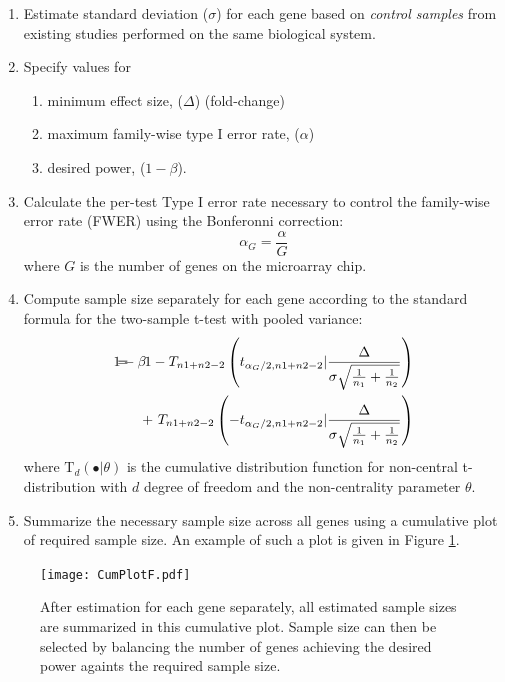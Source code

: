 \documentclass{bioinfo}
\begin{document}
\begin{enumerate}
\item{Estimate standard deviation ($\sigma$) for each gene based on
    \emph{control samples} from existing studies performed on the
    same biological system.}

\item{Specify values for
    \begin{enumerate}
    \item minimum effect size, ($\Delta$) (fold-change)
    \item maximum family-wise type I error rate, ($\alpha$)
    \item desired power, ($1 - \beta$).
    \end{enumerate}
  }

\item{Calculate the per-test Type I error rate necessary to control
    the family-wise error rate (FWER) using the Bonferonni correction:}
\begin{equation}
  \alpha_G = \frac{\alpha}{G}
\end{equation}
%
where $G$ is the number of genes on the microarray chip.

\item{Compute sample size separately for each gene according to the
    standard formula for the two-sample t-test with pooled variance:}
  \begin{eqnarray}
    \lefteqn{1-\beta}
    &=& 1-T_{n1+n2-2} \left( t_{\alpha_G/2,n1+n2-2} | \frac{\Delta}{\sigma \sqrt{\frac{1}{n_1} + \frac{1}{n_2}}}\right) \nonumber \\
    & & +~T_{n1+n2-2} \left( -t_{\alpha_G/2,n1+n2-2} | \frac{\Delta}{\sigma \sqrt{\frac{1}{n_1} + \frac{1}{n_2}}}\right)
    \label{eq:formula}
  \end{eqnarray}
  where $\mathrm{T}_{d}(\bullet|\theta)$ is the cumulative
  distribution function for non-central t-distribution with $d$ degree
  of freedom and the non-centrality parameter $\theta$.

\item{Summarize the necessary sample size across all genes using a
    cumulative plot of required sample size. An example of such a plot
    is given in Figure \ref{fig:CumPlot}.}

\end{enumerate}

\begin{figure}[h]
  \centerline{\texttt{[image: CumPlotF.pdf]}}
  \caption[Cumulative Plot of Sample Size Calculated for All Genes]
  {After estimation for each gene separately, all estimated sample
    sizes are summarized in this cumulative plot. Sample size can then
    be selected by balancing the number of genes achieving the desired
    power againts the required sample size.}
  \label{fig:CumPlot}
\end{figure}
\end{document}
